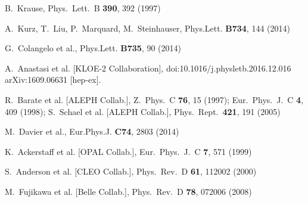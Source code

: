 \documentclass[epj,onecolumn]{webofc}
\begin{document}
\begin{thebibliography}{}
B.~Krause,
Phys.\ Lett.\ B {\bf 390}, 392 (1997)

A.~Kurz, T.~Liu, P.~Marquard, M.~Steinhauser,
Phys.Lett. {\bf B734}, 144 (2014)

G.~Colangelo et al.,
Phys.Lett. {\bf B735}, 90 (2014)

  A.~Anastasi et al. [KLOE-2 Collaboration],
  doi:10.1016/j.physletb.2016.12.016
  arXiv:1609.06631 [hep-ex].

R.~Barate et al. [ALEPH Collab.],
Z.\ Phys.\ C {\bf 76}, 15 (1997);
Eur.\ Phys.\ J.\ C {\bf 4}, 409 (1998);
S.~Schael et al. [ALEPH Collab.],
Phys.\ Rept.\  {\bf 421}, 191 (2005)

M.~Davier et al.,
Eur.Phys.J. {\bf C74}, 2803 (2014)

K.~Ackerstaff et al. [OPAL Collab.],
Eur.\ Phys.\ J.\ C {\bf 7}, 571 (1999)

S.~Anderson et al. [CLEO Collab.],
Phys.\ Rev.\ D {\bf 61}, 112002 (2000)

  M.~Fujikawa et al.  [Belle Collab.],
  Phys.\ Rev.\ D {\bf 78}, 072006 (2008)


\end{thebibliography}
\end{document}
